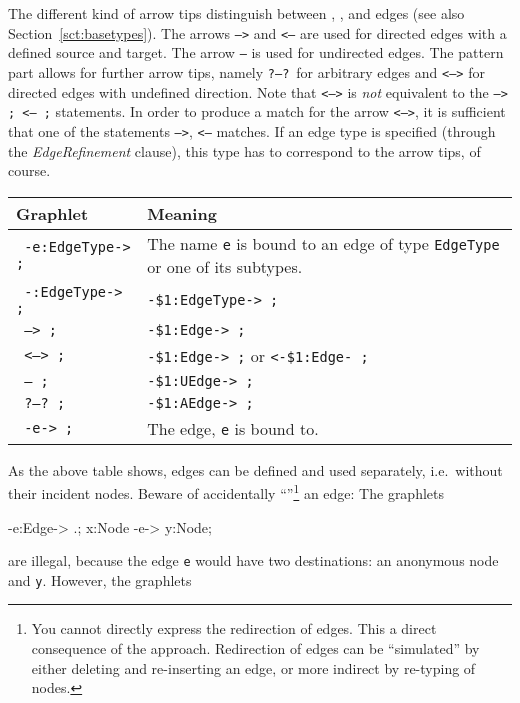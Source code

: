The different kind of arrow tips distinguish between , , and  edges (see also Section~\ref{sct:basetypes}).
The arrows \texttt{-->} and \texttt{<--} are used for directed edges with a defined source and target.
The arrow \texttt{--} is used for undirected edges.
The pattern part allows for further arrow tips, namely \texttt{?--?}\ for arbitrary edges and \texttt{<-->} for directed edges with undefined direction.
Note that \texttt{<-->} is \emph{not} equivalent to the \texttt{--> ; <-- ;} statements.
In order to produce a match for the arrow \texttt{<-->}, it is sufficient that one of the statements \texttt{-->}, \texttt{<--} matches.
If an edge type is specified (through the \emph{EdgeRefinement} clause), this type has to correspond to the arrow tips, of course.
\begin{center}
	\begin{tabularx}{\linewidth}{lX}
		\textbf{Graphlet} & \textbf{Meaning}\\ \hline
		\texttt{ -e:EdgeType-> ;} & The name \texttt{e} is bound to an edge of type \texttt{EdgeType} or one of its subtypes. \\
		\texttt{ -:EdgeType-> ;} & \texttt{-\$1:EdgeType-> ;} \\
		\texttt{ --> ;} & \texttt{-\$1:Edge-> ;} \\
		\texttt{ <--> ;} & \texttt{-\$1:Edge-> ;} or  \texttt{<-\$1:Edge- ;}\\
		\texttt{ -- ;} & \texttt{-\$1:UEdge-> ;} \\
		\texttt{ ?--?\ ;} & \texttt{-\$1:AEdge-> ;} \\
		\texttt{ -e-> ;} & The edge, \texttt{e} is bound to.
	\end{tabularx}
\end{center} 
As the above table shows, edges can be defined and used separately, i.e.\ without their incident nodes. Beware of accidentally ``''\footnote{You cannot directly express the redirection of edges. This a direct consequence of the  approach. Redirection of edges can be ``simulated'' by either deleting and re-inserting an edge, or more indirect by re-typing of nodes.} an edge: 
The graphlets
\begin{grgenlet}
-e:Edge-> .;
x:Node -e-> y:Node;
\end{grgenlet}
are illegal, because the edge \texttt{e} would have two destinations: an anonymous node and \texttt{y}.
However, the graphlets
